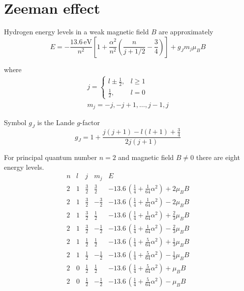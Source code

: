 

\section*{Zeeman effect}

Hydrogen energy levels in a weak magnetic field $B$ are approximately
\begin{equation*}
E=-\frac{13.6\,\text{eV}}{n^2}
\left[
1+\frac{\alpha^2}{n^2}\left(\frac{n}{j+1/2}-\frac{3}{4}\right)
\right]+g_Jm_j\mu_BB
\end{equation*}

where
\begin{gather*}
j=\begin{cases}
l\pm\frac{1}{2}, & l\ge1
\\
\frac{1}{2}, & l=0
\end{cases}
\\[1ex]
m_j=-j,-j+1,\ldots,j-1,j
\end{gather*}

Symbol $g_J$ is the Lande $g$-factor
\begin{equation*}
g_J=1+\frac{j(j+1)-l(l+1)+\frac{3}{4}}{2j(j+1)}
\end{equation*}

For principal quantum number $n=2$ and magnetic field $B\ne0$ there are eight energy levels.
\begin{equation*}
\begin{matrix}
n & l & j & m_j & E
\\[2ex]
2 & 1 & \frac{3}{2} & \frac{3}{2} &
-13.6\,\left(\tfrac{1}{4}+\tfrac{1}{64}\alpha^2\right)+2\mu_BB
\\[1ex]
2 & 1 & \frac{3}{2} & -\frac{3}{2} &
-13.6\,\left(\tfrac{1}{4}+\tfrac{1}{64}\alpha^2\right)-2\mu_BB
\\[2ex]
2 & 1 & \frac{3}{2} & \frac{1}{2} &
-13.6\,\left(\tfrac{1}{4}+\tfrac{1}{64}\alpha^2\right)+\frac{2}{3}\mu_BB
\\[1ex]
2 & 1 & \frac{3}{2} & -\frac{1}{2} &
-13.6\,\left(\tfrac{1}{4}+\tfrac{1}{64}\alpha^2\right)-\frac{2}{3}\mu_BB
\\[2ex]
2 & 1 & \frac{1}{2} & \frac{1}{2} &
-13.6\,\left(\tfrac{1}{4}+\tfrac{5}{64}\alpha^2\right)+\frac{1}{3}\mu_BB
\\[1ex]
2 & 1 & \frac{1}{2} & -\frac{1}{2} &
-13.6\,\left(\tfrac{1}{4}+\tfrac{5}{64}\alpha^2\right)-\frac{1}{3}\mu_BB
\\[2ex]
2 & 0 & \frac{1}{2} & \frac{1}{2} &
-13.6\,\left(\tfrac{1}{4}+\tfrac{5}{64}\alpha^2\right)+\mu_BB
\\[1ex]
2 & 0 & \frac{1}{2} & -\frac{1}{2} &
-13.6\,\left(\tfrac{1}{4}+\tfrac{5}{64}\alpha^2\right)-\mu_BB
\end{matrix}
\end{equation*}


